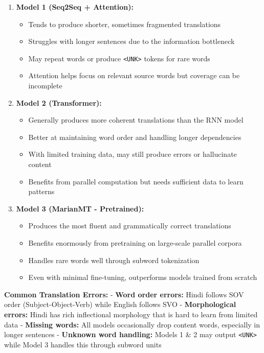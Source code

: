\documentclass[12pt,a4paper,oneside]{report}
\providecommand{\tightlist}{\setlength{\itemsep}{0pt}\setlength{\parskip}{0pt}}
\begin{document}
\begin{enumerate}
\def\labelenumi{\arabic{enumi}.}
\tightlist
\item
  \textbf{Model 1 (Seq2Seq + Attention):}

  \begin{itemize}
  \tightlist
  \item
    Tends to produce shorter, sometimes fragmented translations
  \item
    Struggles with longer sentences due to the information bottleneck
  \item
    May repeat words or produce \texttt{\textless{}UNK\textgreater{}} tokens for rare words
  \item
    Attention helps focus on relevant source words but coverage can be incomplete
  \end{itemize}
\item
  \textbf{Model 2 (Transformer):}

  \begin{itemize}
  \tightlist
  \item
    Generally produces more coherent translations than the RNN model
  \item
    Better at maintaining word order and handling longer dependencies
  \item
    With limited training data, may still produce errors or hallucinate content
  \item
    Benefits from parallel computation but needs sufficient data to learn patterns
  \end{itemize}
\item
  \textbf{Model 3 (MarianMT - Pretrained):}

  \begin{itemize}
  \tightlist
  \item
    Produces the most fluent and grammatically correct translations
  \item
    Benefits enormously from pretraining on large-scale parallel corpora
  \item
    Handles rare words well through subword tokenization
  \item
    Even with minimal fine-tuning, outperforms models trained from scratch
  \end{itemize}
\end{enumerate}

\textbf{Common Translation Errors:}
- \textbf{Word order errors:} Hindi follows SOV order (Subject-Object-Verb) while English follows SVO
- \textbf{Morphological errors:} Hindi has rich inflectional morphology that is hard to learn from limited data
- \textbf{Missing words:} All models occasionally drop content words, especially in longer sentences
- \textbf{Unknown word handling:} Models 1 \& 2 may output \texttt{\textless{}UNK\textgreater{}} while Model 3 handles this through subword units
\end{document}
